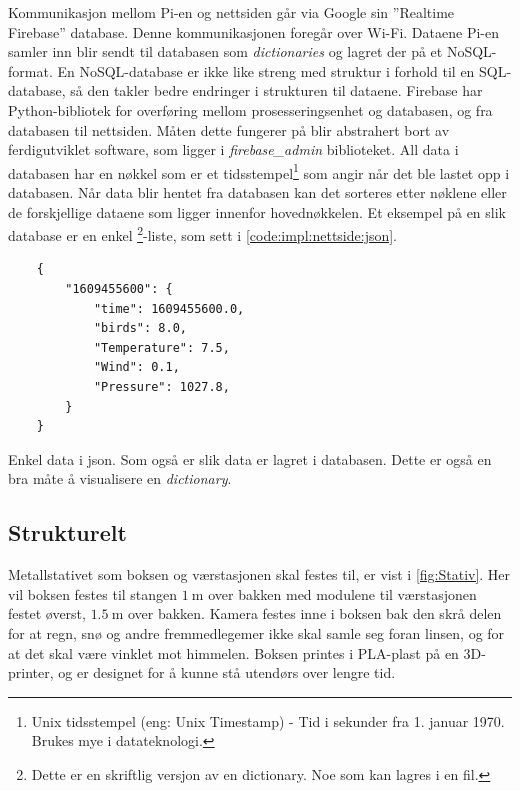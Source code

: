 Kommunikasjon mellom Pi-en og nettsiden går via Google sin ''Realtime Firebase'' database. 
Denne kommunikasjonen foregår over Wi-Fi. 
Dataene Pi-en samler inn blir sendt til databasen som \textit{dictionaries} og lagret der på et NoSQL-format. 
En NoSQL-database er ikke like streng med struktur i forhold til en SQL-database, så den takler bedre endringer i strukturen til dataene. 
Firebase har Python-bibliotek for overføring mellom prosesseringsenhet og databasen, og fra databasen til nettsiden. 
Måten dette fungerer på blir abstrahert bort av ferdigutviklet software, som ligger i \textit{firebase\_admin} biblioteket. 
All data i databasen har en nøkkel som er et tidsstempel\footnote{Unix tidsstempel (eng: Unix Timestamp) - Tid i sekunder fra 1. januar 1970. Brukes mye i datateknologi.} som angir når det ble lastet opp i databasen. 
Når data blir hentet fra databasen kan det sorteres etter nøklene eller de forskjellige dataene som ligger innenfor hovednøkkelen.
Et eksempel på en slik database er en enkel \footnote{Dette er en skriftlig versjon av en dictionary. Noe som kan lagres i en fil.}-liste, som sett i \autoref{code:impl:nettside:json}.

\begin{listing}[!htb]
    \begin{verbatim}
    {
        "1609455600": {
            "time": 1609455600.0, 
            "birds": 8.0, 
            "Temperature": 7.5, 
            "Wind": 0.1, 
            "Pressure": 1027.8,
        }  
    }
    \end{verbatim}
    \caption{Enkel data i json. Som også er slik data er lagret i databasen. Dette er også en bra måte å visualisere en \textit{dictionary}.}
    \label{code:impl:nettside:json}
\end{listing}

\newpage
\subsection{Strukturelt}\label{sec:impl:struktur}

Metallstativet som boksen og værstasjonen skal festes til, er vist i \autoref{fig:Stativ}. 
Her vil boksen festes til stangen $\SI{1}{\meter}$ over bakken med modulene til værstasjonen festet øverst, $\SI{1.5}{\meter}$ over bakken. 
Kamera festes inne i boksen bak den skrå delen for at regn, snø og andre fremmedlegemer ikke skal samle seg foran linsen, og for at det skal være vinklet mot himmelen. 
Boksen printes i PLA-plast på en 3D-printer, og er designet for å kunne stå utendørs over lengre tid.

